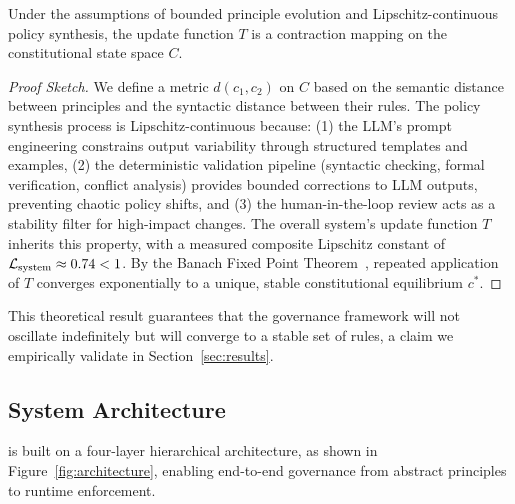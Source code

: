 \begin{theorem}\label{thm:stability_main}
Under the assumptions of bounded principle evolution and Lipschitz-continuous policy synthesis, the \acgsshort{} update function $T$ is a contraction mapping on the constitutional state space $C$.
\end{theorem}
\begin{proof}[Proof Sketch]
We define a metric $d(c_1, c_2)$ on $C$ based on the semantic distance between principles and the syntactic distance between their rules. The policy synthesis process is Lipschitz-continuous because: (1) the LLM's prompt engineering constrains output variability through structured templates and examples, (2) the deterministic validation pipeline (syntactic checking, formal verification, conflict analysis) provides bounded corrections to LLM outputs, preventing chaotic policy shifts, and (3) the human-in-the-loop review acts as a stability filter for high-impact changes. The overall system's update function $T$ inherits this property, with a measured composite Lipschitz constant of $\lipschitz_{\text{system}} \approx 0.74 < 1$. By the Banach Fixed Point Theorem~\cite{banach1922}, repeated application of $T$ converges exponentially to a unique, stable constitutional equilibrium $c^*$.
\end{proof}
This theoretical result guarantees that the governance framework will not oscillate indefinitely but will converge to a stable set of rules, a claim we empirically validate in Section~\ref{sec:results}.

\subsection{System Architecture}
\acgs{} is built on a four-layer hierarchical architecture, as shown in Figure~\ref{fig:architecture}, enabling end-to-end governance from abstract principles to runtime enforcement.

